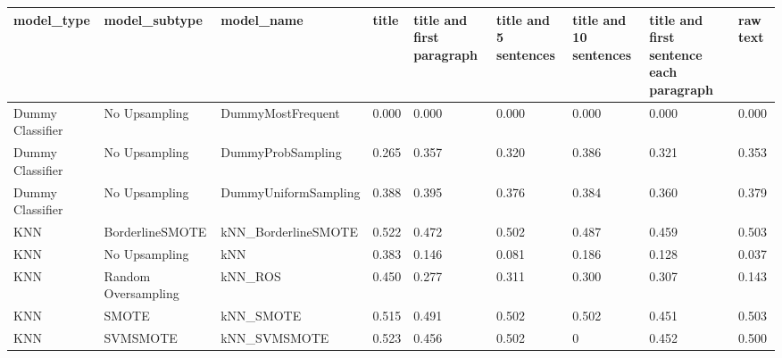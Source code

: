 \begin{tabular}{lllllllll}
\toprule
                  model\_type &       model\_subtype &                                   model\_name & title & title and first paragraph & title and 5 sentences & title and 10 sentences & title and first sentence each paragraph &  raw text \\
\midrule
            Dummy Classifier &       No Upsampling &                            DummyMostFrequent & 0.000 &                     0.000 &                 0.000 &                  0.000 &                                   0.000 &     0.000 \\
            Dummy Classifier &       No Upsampling &                            DummyProbSampling & 0.265 &                     0.357 &                 0.320 &                  0.386 &                                   0.321 &     0.353 \\
            Dummy Classifier &       No Upsampling &                         DummyUniformSampling & 0.388 &                     0.395 &                 0.376 &                  0.384 &                                   0.360 &     0.379 \\
                         KNN &     BorderlineSMOTE &                          kNN\_BorderlineSMOTE & 0.522 &                     0.472 &                 0.502 &                  0.487 &                                   0.459 &     0.503 \\
                         KNN &       No Upsampling &                                          kNN & 0.383 &                     0.146 &                 0.081 &                  0.186 &                                   0.128 &     0.037 \\
                         KNN & Random Oversampling &                                      kNN\_ROS & 0.450 &                     0.277 &                 0.311 &                  0.300 &                                   0.307 &     0.143 \\
                         KNN &               SMOTE &                                    kNN\_SMOTE & 0.515 &                     0.491 &                 0.502 &                  0.502 &                                   0.451 &     0.503 \\
                         KNN &            SVMSMOTE &                                 kNN\_SVMSMOTE & 0.523 &                     0.456 &                 0.502 &                      0 &                                   0.452 &     0.500 \\

\end{tabular}
